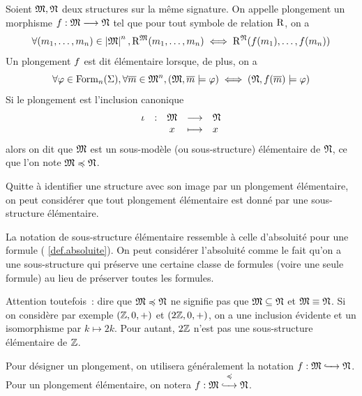 \begin{definition}
  Soient $\mathfrak{M},\mathfrak{N}$ deux structures sur la même signature. On appelle
  plongement un morphisme $f : \displaystyle \mathfrak{M} \longrightarrow \mathfrak{N}$ tel que
  pour tout symbole de relation $\mathrm{R}$, on a
  \[\forall(m_1,\ldots,m_n)\in\left\vert \mathfrak{M}\right\vert^n,
  \mathrm{R}^{\mathfrak{M}}(m_1,\ldots,m_n) \iff
  \mathrm{R}^{\mathfrak{N}}(f(m_1),\ldots,f(m_n))\]
  Un plongement $f$ est dit élémentaire lorsque, de plus, on a
  \[\forall \varphi\in\operatorname{Form}_n(\Sigma),\forall \overline{m}\in\mathfrak{M}^n,
  (\mathfrak{M},\overline{m}\models \varphi) \iff
  (\mathfrak{N},f(\overline{m})\models\varphi)\]
  Si le plongement est l'inclusion canonique
  \[\makeFun{\iota}{\varMM}{\varMN}{x}{x}\]
  alors on dit que $\mathfrak{M}$ est un sous-modèle (ou sous-structure) élémentaire
  de $\mathfrak{N}$, ce que l'on note $\mathfrak{M}\preccurlyeq\mathfrak{N}$.
  \index[notation]{$\subModElt$}
\end{definition}

\begin{remark}
  Quitte à identifier une structure avec son image par un plongement
  élémentaire, on peut considérer que tout plongement élémentaire est donné par
  une sous-structure élémentaire.
\end{remark}

\begin{remark}
  La notation de sous-structure élémentaire ressemble à celle d'absoluité pour
  une formule ( \cref{def.absoluite}). On peut considérer
  l'absoluité comme le fait qu'on a une sous-structure qui préserve une
  certaine classe de formules (voire une seule formule) au lieu de préserver
  toutes les formules.
\end{remark}

\begin{remark}
  Attention toutefois~: dire que $\mathfrak{M}\preccurlyeq\mathfrak{N}$ ne signifie pas que
  $\mathfrak{M}\subseteq\mathfrak{N}$ et $\mathfrak{M}\equiv\mathfrak{N}$. Si on considère par exemple
  $(\mathbb Z,0,+)$ et $(2\mathbb Z,0,+)$, on a une inclusion évidente et un isomorphisme
  par $k \mapsto 2k$. Pour autant, $2\mathbb Z$ n'est pas une sous-structure
  élémentaire de $\mathbb Z$.
\end{remark}

\begin{notation}
  Pour désigner un plongement, on utilisera généralement la notation
  $f : \displaystyle \mathfrak{M} \xhookrightarrow{\quad} \mathfrak{N}$. Pour un plongement élémentaire,
  on notera $f : \displaystyle \mathfrak{M} \overset{\preccurlyeq}{\xhookrightarrow{\quad}} \mathfrak{N}$.
\end{notation}

